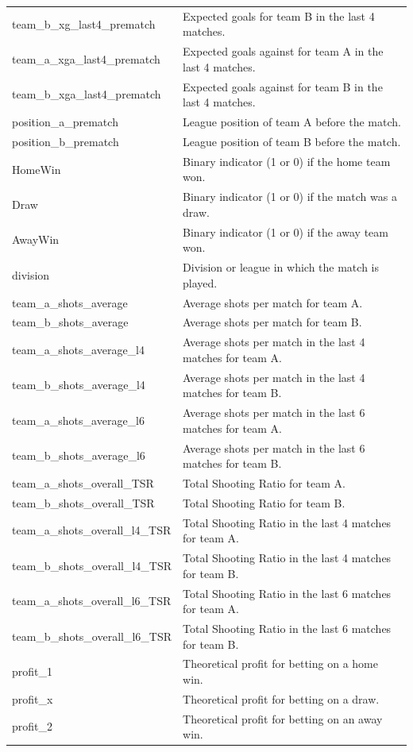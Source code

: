 \documentclass[rgb,listoffigures,listoftables,final]{cam-thesis}
\begin{document}
\begin{center}
\begin{longtable}{ll}
        team\_b\_xg\_last4\_prematch & Expected goals for team B in the last 4 matches. \\
        team\_a\_xga\_last4\_prematch & Expected goals against for team A in the last 4 matches. \\
        team\_b\_xga\_last4\_prematch & Expected goals against for team B in the last 4 matches. \\
        position\_a\_prematch & League position of team A before the match. \\
        position\_b\_prematch & League position of team B before the match. \\
        HomeWin & Binary indicator (1 or 0) if the home team won. \\
        Draw & Binary indicator (1 or 0) if the match was a draw. \\
        AwayWin & Binary indicator (1 or 0) if the away team won. \\
        division & Division or league in which the match is played. \\
        team\_a\_shots\_average & Average shots per match for team A. \\
        team\_b\_shots\_average & Average shots per match for team B. \\
        team\_a\_shots\_average\_l4 & Average shots per match in the last 4 matches for team A. \\
        team\_b\_shots\_average\_l4 & Average shots per match in the last 4 matches for team B. \\
        team\_a\_shots\_average\_l6 & Average shots per match in the last 6 matches for team A. \\
        team\_b\_shots\_average\_l6 & Average shots per match in the last 6 matches for team B. \\
        team\_a\_shots\_overall\_TSR & Total Shooting Ratio for team A. \\
        team\_b\_shots\_overall\_TSR & Total Shooting Ratio for team B. \\
        team\_a\_shots\_overall\_l4\_TSR & Total Shooting Ratio in the last 4 matches for team A. \\
        team\_b\_shots\_overall\_l4\_TSR & Total Shooting Ratio in the last 4 matches for team B. \\
        team\_a\_shots\_overall\_l6\_TSR & Total Shooting Ratio in the last 6 matches for team A. \\
        team\_b\_shots\_overall\_l6\_TSR & Total Shooting Ratio in the last 6 matches for team B. \\
        profit\_1 & Theoretical profit for betting on a home win. \\
        profit\_x & Theoretical profit for betting on a draw. \\
        profit\_2 & Theoretical profit for betting on an away win. \\
    \end{longtable}
    \end{center}
\end{document}
